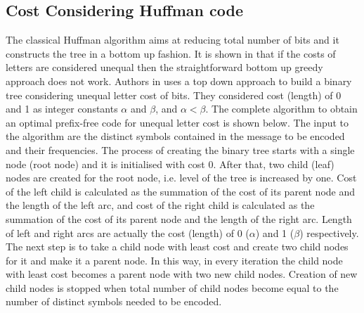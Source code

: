 \documentclass[preprint,12pt]{elsarticle}
\begin{document}
\subsection{Cost Considering Huffman code}
The classical Huffman algorithm aims at reducing total number of bits and it constructs the tree in a bottom up fashion. It is shown in \cite{golin98} that if the costs of letters are considered unequal then the straightforward bottom up greedy approach does not work. Authors in \cite{Kab14} uses a top down approach to build a binary tree considering unequal letter cost of bits. They considered cost (length) of 0 and 1 as integer constants $\alpha$ and $\beta$, and  $\alpha < \beta$. The complete algorithm to obtain an optimal prefix-free code for unequal letter cost is shown below. The input to the algorithm are the distinct symbols contained in the message to be encoded and their frequencies. The process of creating the binary tree starts with a single node (root node) and it is initialised with cost 0.  After that, two child (leaf) nodes are created for the root node, i.e. level of the tree is increased by one. Cost of the left child is calculated as the summation of the cost of its parent node and the length of the left arc, and cost of the right child is calculated as the summation of the cost of its parent node and the length of the right arc. Length of left and right arcs are actually the cost (length) of 0 ($\alpha$) and 1 ($\beta$) respectively. The next step is to take a child node with least cost and create two child nodes for it and make it a parent node. In this way, in every iteration the child node with least cost becomes a parent node with two new child nodes. Creation of new child nodes is stopped when total number of child nodes become equal to the number of distinct symbols needed to be encoded. 
\end{document}
